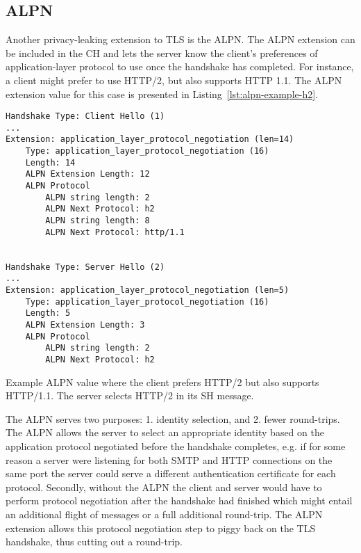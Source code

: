 \subsection{ALPN}
Another privacy-leaking  extension to \ac{TLS} is the \ac{ALPN}. The \ac{ALPN} extension can be
included in the \ac{CH} and lets the server know the client's preferences
of application-layer protocol to use once the handshake has completed.
For instance, a client might prefer to use \ac{HTTP}/2, but also supports \ac{HTTP} 1.1.
The \ac{ALPN} extension value for this case is presented in Listing~\ref{lst:alpn-example-h2}.

\begin{listing}[hb]
\begin{Verbatim}[frame=single, fontsize=\small]
Handshake Type: Client Hello (1)
...
Extension: application_layer_protocol_negotiation (len=14)
    Type: application_layer_protocol_negotiation (16)
    Length: 14
    ALPN Extension Length: 12
    ALPN Protocol
        ALPN string length: 2
        ALPN Next Protocol: h2
        ALPN string length: 8
        ALPN Next Protocol: http/1.1


Handshake Type: Server Hello (2)
...
Extension: application_layer_protocol_negotiation (len=5)
    Type: application_layer_protocol_negotiation (16)
    Length: 5
    ALPN Extension Length: 3
    ALPN Protocol
        ALPN string length: 2
        ALPN Next Protocol: h2
\end{Verbatim}
\captionsetup{width=0.8\linewidth}
\caption[Example ALPN Value]{\label{lst:alpn-example-h2}Example \ac{ALPN} value where the client prefers \ac{HTTP}/2 but also supports \ac{HTTP}/1.1. The server selects \ac{HTTP}/2 in its \ac{SH} message.}
\end{listing}

The \ac{ALPN} serves two purposes: 1. identity selection, and 2. fewer round-trips.
The \ac{ALPN} allows the server to select an appropriate identity based on the application
protocol negotiated before the handshake completes, e.g. if for some reason a server were listening for both \ac{SMTP} and  \ac{HTTP} connections on the same port
the server could serve a different authentication certificate for each protocol.
Secondly, without the \ac{ALPN} the client and server would have to perform protocol negotiation after the handshake had finished
which might entail an additional flight of messages or a full additional round-trip.
The \ac{ALPN} extension allows
this protocol negotiation step to piggy back on the \ac{TLS} handshake, thus cutting out a round-trip.

